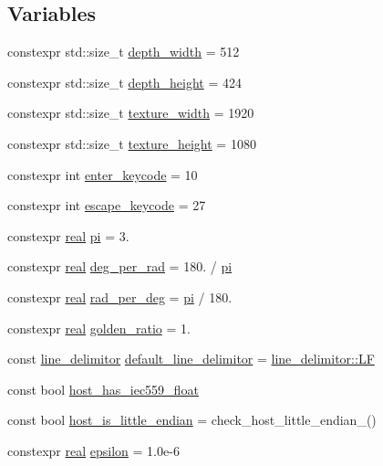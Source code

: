 \subsection*{Variables}
\begin{DoxyCompactItemize}
\item 
constexpr std\+::size\+\_\+t \hyperlink{namespacetlz_a501a85306cfc7e516a67b28581657227}{depth\+\_\+width} = 512
\item 
constexpr std\+::size\+\_\+t \hyperlink{namespacetlz_ae3b52fb4f7d8e6c5498d5aedee8d9767}{depth\+\_\+height} = 424
\item 
constexpr std\+::size\+\_\+t \hyperlink{namespacetlz_a9e9fa482b4c479c635c496e96014f75a}{texture\+\_\+width} = 1920
\item 
constexpr std\+::size\+\_\+t \hyperlink{namespacetlz_afb346da3114b6061a9bc5ce4a95b93fc}{texture\+\_\+height} = 1080
\item 
constexpr int \hyperlink{namespacetlz_ad1e3b7cf1657f9d2d03a6024cee9c829}{enter\+\_\+keycode} = 10
\item 
constexpr int \hyperlink{namespacetlz_a7ebc5d7ffd41d61b0d2ccda50d705fb4}{escape\+\_\+keycode} = 27
\item 
constexpr \hyperlink{namespacetlz_a15fd37cce97f2b8b606af18c2615f602}{real} \hyperlink{namespacetlz_ac4eee635011d10eb47adf9eba0e6b977}{pi} = 3.
\item 
constexpr \hyperlink{namespacetlz_a15fd37cce97f2b8b606af18c2615f602}{real} \hyperlink{namespacetlz_a22c927109d829916d5b2a6ea5ee326f9}{deg\+\_\+per\+\_\+rad} = 180. / \hyperlink{namespacetlz_ac4eee635011d10eb47adf9eba0e6b977}{pi}
\item 
constexpr \hyperlink{namespacetlz_a15fd37cce97f2b8b606af18c2615f602}{real} \hyperlink{namespacetlz_a79e0cbce3856b92202ca2107fb7e495d}{rad\+\_\+per\+\_\+deg} = \hyperlink{namespacetlz_ac4eee635011d10eb47adf9eba0e6b977}{pi} / 180.
\item 
constexpr \hyperlink{namespacetlz_a15fd37cce97f2b8b606af18c2615f602}{real} \hyperlink{namespacetlz_a2c17d7f52299e459ae627624a0b35176}{golden\+\_\+ratio} = 1.
\item 
const \hyperlink{namespacetlz_a9643974618d6e98138d9b009f5f6123d}{line\+\_\+delimitor} \hyperlink{namespacetlz_a14b9a0ef3891454f12df2edd33c54305}{default\+\_\+line\+\_\+delimitor} = \hyperlink{namespacetlz_a9643974618d6e98138d9b009f5f6123da618441d41cce47dbcfd9bed6e5ff64e6}{line\+\_\+delimitor\+::\+LF}
\item 
const bool \hyperlink{namespacetlz_a9cd815775329b5fc67db8e70937b5df5}{host\+\_\+has\+\_\+iec559\+\_\+float}
\item 
const bool \hyperlink{namespacetlz_a042151a8f7bfa1208c9be493b4d40e2c}{host\+\_\+is\+\_\+little\+\_\+endian} = check\+\_\+host\+\_\+little\+\_\+endian\+\_\+()
\item 
constexpr \hyperlink{namespacetlz_a15fd37cce97f2b8b606af18c2615f602}{real} \hyperlink{namespacetlz_a7c30b7b29f4c1fc93cc06c997e4a8d07}{epsilon} = 1.\+0e-\/6
\end{DoxyCompactItemize}


